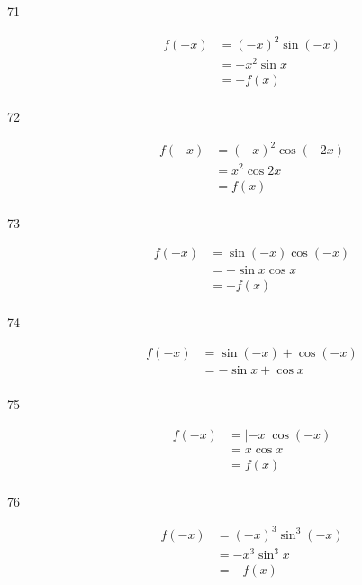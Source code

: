 \documentclass{exam}
\begin{document}
\begin{description}
      \item[71]
        \begin{align*}
          f(-x) & = (-x)^2 \sin(-x) \\
                & = - x^2 \sin x \\
                & = - f(x) \\
        \end{align*}


      \item[72]
        \begin{align*}
          f(-x) & = (-x)^2 \cos(-2x) \\
                & = x^2 \cos 2x \\
                & = f(x) \\
        \end{align*}


      \item[73]
        \begin{align*}
          f(-x) & = \sin (-x) \cos (-x) \\
                & = - \sin x \cos x \\
                & = -f(x) \\
        \end{align*}


      \item[74]
        \begin{align*}
          f(-x) & = \sin (-x) + \cos (-x) \\
                & = - \sin x + \cos x \\
        \end{align*}


      \item[75]
        \begin{align*}
          f(-x) & = | -x | \cos (-x) \\
                & = x \cos x \\
                & = f(x) \\
        \end{align*}

      \item[76]
        \begin{align*}
          f(-x) & = (-x)^3 \sin^3 (-x) \\
                & = - x^3 \sin^3 x \\
                & = - f(x) \\
        \end{align*}


\end{description}
\end{document}
